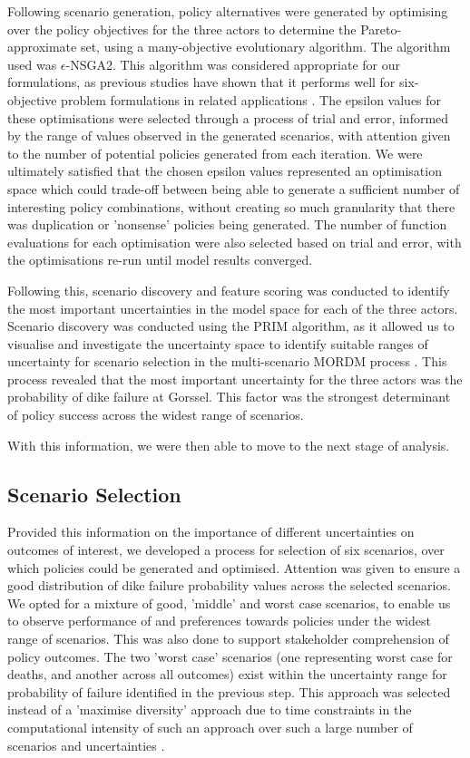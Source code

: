 Following scenario generation, policy alternatives were generated by optimising over the policy objectives for the three actors to determine the Pareto-approximate set, using a many-objective evolutionary algorithm. The algorithm used was $\epsilon$-NSGA2. This algorithm was considered appropriate for our formulations, as previous studies have shown that it performs well for six-objective problem formulations in related applications \parencite{salazar_diagnostic_2016}. The epsilon values for these optimisations were selected through a process of trial and error, informed by the range of values observed in the generated scenarios, with attention given to the number of potential policies generated from each iteration. We were ultimately satisfied that the chosen epsilon values represented an optimisation space which could trade-off between being able to generate a sufficient number of interesting policy combinations, without creating so much granularity that there was duplication or 'nonsense' policies being generated. The number of function evaluations for each optimisation were also selected based on trial and error, with the optimisations re-run until model results converged.

Following this, scenario discovery and feature scoring was conducted to identify the most important uncertainties in the model space for each of the three actors. Scenario discovery was conducted using the PRIM algorithm, as it allowed us to visualise and investigate the uncertainty space to identify suitable ranges of uncertainty for scenario selection in the multi-scenario MORDM process \parencite{bryant_thinking_2010}. This process revealed that the most important uncertainty for the three actors was the probability of dike failure at Gorssel. This factor was the strongest determinant of policy success across the widest range of scenarios.

With this information, we were then able to move to the next stage of analysis.

\subsection{Scenario Selection}
Provided this information on the importance of different uncertainties on outcomes of interest, we developed a process for selection of six scenarios, over which policies could be generated and optimised. Attention was given to ensure a good distribution of dike failure probability values across the selected scenarios. We opted for a mixture of good, 'middle' and worst case scenarios, to enable us to observe performance of and preferences towards policies under the widest range of scenarios. This was also done to support stakeholder comprehension of policy outcomes. The two 'worst case' scenarios (one representing worst case for deaths, and another across all outcomes) exist within the uncertainty range for probability of failure identified in the previous step. This approach was selected instead of a 'maximise diversity' approach due to time constraints in the computational intensity of such an approach over such a large number of scenarios and uncertainties \parencite{eker_including_2018}.

